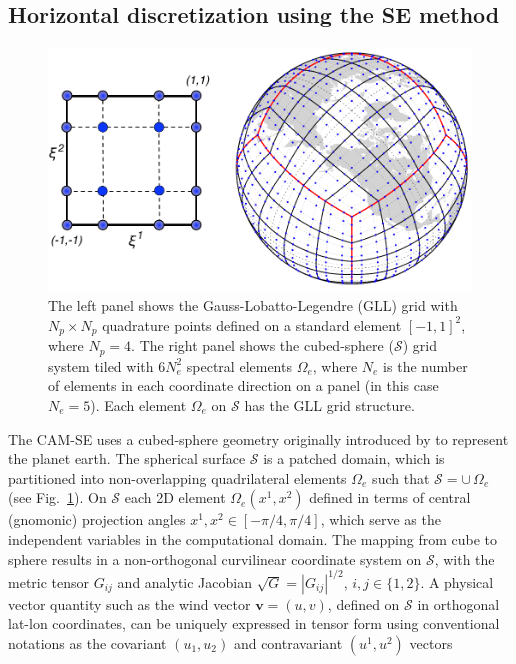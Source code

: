 \documentclass{agujournal}
\begin{document}
{\subsection{Horizontal discretization using the SE method}
  \begin{figure}[h]
\centering
 \includegraphics[scale=0.75]{figs/cs_gll4_2017}
 \caption{The left panel shows the  Gauss-Lobatto-Legendre (GLL)   grid with $ N_p \times  N_p$ quadrature points defined
 on a standard element $[-1,1]^2$, where $N_p=4$. The right panel shows the cubed-sphere ($\mathcal{S}$) grid system tiled with 
 $6 N_e^2 $ spectral elements $\Omega_e$, where $N_e$ is the number of elements  in each coordinate direction
 on a panel (in this case $N_e=5$). 
 Each element  $\Omega_e$ on $\mathcal{S}$ has the GLL grid structure.  }
 \label{fig:gll4}
\end{figure}
    The CAM-SE 
 uses a cubed-sphere geometry  originally introduced by \cite{S1972MWR}  to represent the planet earth. The  spherical   surface 
  $\mathcal{S}$ is  a patched domain,  which is partitioned  into   non-overlapping quadrilateral elements 
 $\Omega_e$ such that $\mathcal{S} = \cup \, \Omega_e$ (see Fig.~\ref{fig:gll4}). 
  On   $\mathcal{S}$  each 2D  element $\Omega_e(x^1,x^2)$  defined in terms of
 central  (gnomonic) projection angles $x^1,x^2 \in [-\pi/4, \pi/4]$, which serve as  the independent variables in the computational domain. 
 The mapping from cube to sphere results in a non-orthogonal curvilinear  coordinate system on $\mathcal{S}$, with 
 the  metric tensor $G_{ij}$ and  analytic Jacobian $ \sqrt{G} =  |G_{ij}|^{1/2}$, $i, j \in \{1,2\}$. 
 A  physical vector quantity  such as the wind vector $\mathbf{v} = (u,v)$,  defined on  $\mathcal{S}$
 in  orthogonal lat-lon coordinates,  can  be uniquely
 expressed in tensor form using conventional notations as the covariant $(u_1,u_2)$ and contravariant  $(u^1, u^2)$ vectors 
}
\end{document}
